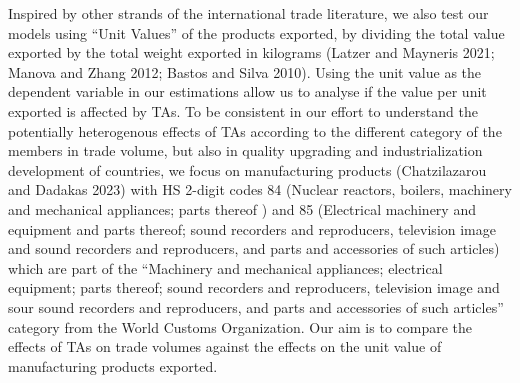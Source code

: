 Inspired by other strands of the international trade literature, we also
test our models using ``Unit Values'' of the products exported, by
dividing the total value exported by the total weight exported in
kilograms (Latzer and Mayneris 2021; Manova and Zhang 2012; Bastos and
Silva 2010). Using the unit value as the dependent variable in our
estimations allow us to analyse if the value per unit exported is
affected by TAs. To be consistent in our effort to understand the
potentially heterogenous effects of TAs according to the different
category of the members in trade volume, but also in quality upgrading
and industrialization development of countries, we focus on
manufacturing products (Chatzilazarou and Dadakas 2023) with HS 2-digit
codes 84 (Nuclear reactors, boilers, machinery and mechanical
appliances; parts thereof ) and 85 (Electrical machinery and equipment
and parts thereof; sound recorders and reproducers, television image and
sound recorders and reproducers, and parts and accessories of such
articles) which are part of the ``Machinery and mechanical appliances;
electrical equipment; parts thereof; sound recorders and reproducers,
television image and sour sound recorders and reproducers, and parts and
accessories of such articles'' category from the World Customs
Organization. Our aim is to compare the effects of TAs on trade volumes
against the effects on the unit value of manufacturing products
exported.
